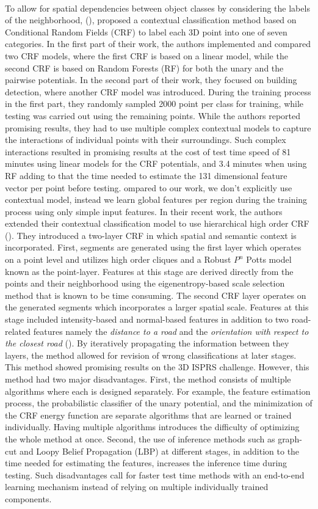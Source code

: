 \documentclass[final,3p,times,twocolumn,authoryear]{elsarticle}
\newcommand{\mxy}[1]{ \color{red}{#1}}
\begin{document}
\\To allow for spatial dependencies between object classes by considering the labels of the neighborhood, (\cite{NIEMEYER2014152}), proposed a contextual classification method based on Conditional Random Fields (CRF) to label each 3D point into one of seven categories. In the first part of their work, the authors implemented and compared two CRF models, where the first CRF is based on a linear model, while the second CRF is based on Random Forests (RF) for both the unary and the pairwise potentials. In the second part of their work, they focused on building detection, where another CRF model was introduced. During the training process in the first part, they randomly sampled 2000 point per class for training, while testing was carried out using the remaining points. While the authors reported promising results, they had to use multiple complex contextual models to capture the interactions of individual points with their surroundings. Such complex interactions resulted in promising results at the cost of test time speed of 81 minutes using linear models for the CRF potentials, and 3.4 minutes when using RF adding to that the time needed to estimate the 131 dimensional feature vector per point before testing. {\mxy Compared to our work, we don't explicitly use contextual model, instead we learn global features per region during the training process using only simple input features}. In their recent work, the authors extended their contextual classification model to use hierarchical high order CRF (\cite{NIEMEYER2016}). They introduced a two-layer CRF in which spatial and semantic context is incorporated. First, segments are generated using the first layer which operates on a point level and utilizes high order cliques and a Robust $P^{n}$ Potts model known as the point-layer. Features at this stage are derived directly from the points and their neighborhood using the eigenentropy-based scale selection method that is known to be time consuming. The second CRF layer operates on the generated segments which incorporates a larger spatial scale. Features at this stage included intensity-based and normal-based features in addition to two road-related features namely the {\it distance to a road} and the {\it orientation with respect to the closest road} (\cite{Golovinskiy}). By iteratively propagating the information between they layers, the method allowed for revision of wrong classifications at later stages. This method showed promising results on the 3D ISPRS challenge. However, this method had two major disadvantages. First, the method consists of multiple algorithms where each is designed separately. For example, the feature estimation process, the probabilistic classifier of the unary potential, and the minimization of the CRF energy function are separate algorithms that are learned or trained individually. Having multiple algorithms introduces the difficulty of optimizing the whole method at once. Second, the use of inference methods such as graph-cut and Loopy Belief Propagation (LBP) at different stages, in addition to the time needed for estimating the features, increases the inference time during testing. Such disadvantages call for faster test time methods with an end-to-end learning mechanism instead of relying on multiple individually trained components. 
\end{document}
